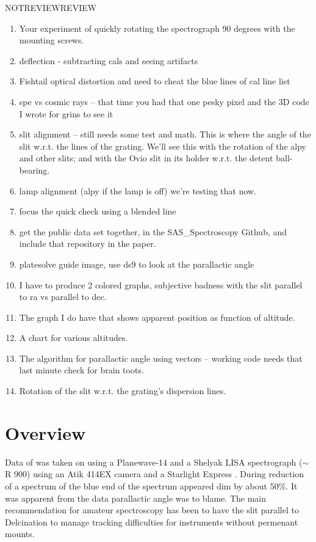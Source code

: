 \documentclass[letter,11pt,oneside]{article}
\def\documentreview{NOTREVIEW}
\def\reviewtest{REVIEW}
\newcommand{\target}{{\color{red}{TARGET TBD~}}}
\newcommand{\then}{{\color{red}{DATE TBD~}}}
\newcommand{\guidemodel}{{\color{red}{GUIDEMODEL TBD~}}}
\begin{document}
\ifx\documentreview\reviewtest
\vspace{-.15cm}
\begin{enumerate}\addtolength{\itemsep}{-0.5\baselineskip}
   \item   Your experiment of quickly rotating the spectrograph
90 degrees with the mounting screws.
   \item   deflection - subtracting cals and seeing artifacts
   \item   Fishtail optical distortion and need to cheat the blue lines
of cal line list
   \item   spe vs cosmic rays -- that time you had that one pesky pixel
and the 3D code I wrote for grins to see it
   \item   slit alignment -- still needs some test and math. This is where
the angle of the slit w.r.t. the lines of the grating. We'll see this
with the rotation of the alpy and other slits; and with the Ovio
slit in its holder w.r.t. the detent ball-bearing.
   \item   lamp alignment (alpy if the lamp is off) we're testing that now.
   \item   focus the quick check using a blended line
   \item   get the public data set together, in the SAS\_Spectroscopy
Github, and include that repository in the paper.
   \item platesolve guide image, use ds9 to look at the parallactic angle
   \item  I have to produce 2 colored graphs, subjective badness with
the slit parallel to ra vs parallel to dec.
   \item  The graph I do have that shows apparent position as function
of altitude.
   \item   A chart for various altitudes.
   \item   The algorithm for parallactic angle using vectors -- working
code needs that last minute check for brain toots.
   \item  Rotation of the slit w.r.t. the grating's dispersion lines.
\end{enumerate}
\fi

\section{Overview}

Data of \target was taken on \then using a Planewave-14 and a Shelyak
LISA spectrograph ($\sim$ R 900) using an Atik 414EX camera and a
Starlight Express \guidemodel.  During reduction of a spectrum of
\target the blue end of the spectrum appeared dim by about 50\%. It
was apparent from the data parallactic angle was to blame. The main
recommendation for amateur spectroscopy has been to have the slit
parallel to Delcination to manage tracking difficulties for
instruments without permenant mounts. 
\end{document}
